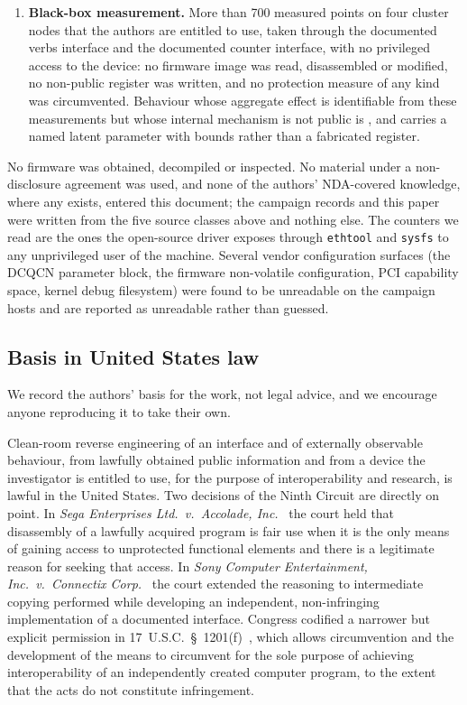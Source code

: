 \begin{enumerate}
    cited where used, including the anomaly-search method we adapted, the
    congestion-control algorithm the device implements, and prior
    microarchitectural studies of RDMA NICs.
  \item \textbf{Black-box measurement.} More than 700 measured points on four
    cluster nodes that the authors are entitled to use, taken through the
    documented verbs interface and the documented counter interface, with no
    privileged access to the device: no firmware image was read, disassembled
    or modified, no non-public register was written, and no protection measure
    of any kind was circumvented. Behaviour whose aggregate effect is
    identifiable from these measurements but whose internal mechanism is not
    public is \evcal{}, and carries a named latent parameter with bounds rather
    than a fabricated register.
\end{enumerate}

No firmware was obtained, decompiled or inspected. No material under a
non-disclosure agreement was used, and none of the authors' NDA-covered
knowledge, where any exists, entered this document; the campaign records and
this paper were written from the five source classes above and nothing else.
The counters we read are the ones the open-source driver exposes through
\texttt{ethtool} and \texttt{sysfs} to any unprivileged user of the machine.
Several vendor configuration surfaces (the DCQCN parameter block, the firmware
non-volatile configuration, PCI capability space, kernel debug filesystem) were
found to be unreadable on the campaign hosts and are reported as unreadable
rather than guessed.

\subsection{Basis in United States law}

We record the authors' basis for the work, not legal advice, and we encourage
anyone reproducing it to take their own.

Clean-room reverse engineering of an interface and of externally observable
behaviour, from lawfully obtained public information and from a device the
investigator is entitled to use, for the purpose of interoperability and
research, is lawful in the United States. Two decisions of the Ninth Circuit
are directly on point. In \emph{Sega Enterprises Ltd.\ v.\ Accolade,
Inc.}~\cite{sega1992} the court held that disassembly of a lawfully acquired
program is fair use when it is the only means of gaining access to unprotected
functional elements and there is a legitimate reason for seeking that access.
In \emph{Sony Computer Entertainment, Inc.\ v.\ Connectix Corp.}~\cite{sony2000}
the court extended the reasoning to intermediate copying performed while
developing an independent, non-infringing implementation of a documented
interface. Congress codified a narrower but explicit permission in
17~U.S.C.~\S~1201(f)~\cite{usc1201f}, which allows circumvention and the
development of the means to circumvent for the sole purpose of achieving
interoperability of an independently created computer program, to the extent
that the acts do not constitute infringement.

